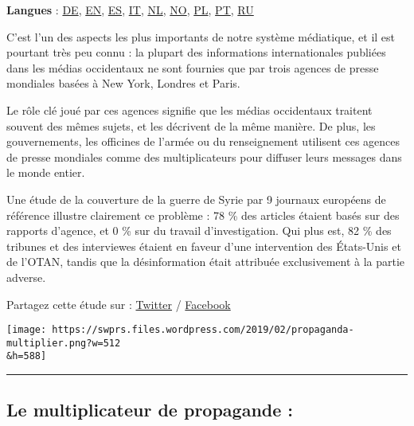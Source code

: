 \textbf{Langues} :
\href{https://swprs.org/der-propaganda-multiplikator/}{DE},
\href{https://swprs.org/the-propaganda-multiplier/}{EN},
\href{https://www.bibliotecapleyades.net/sociopolitica2/sociopol_mediacontrol225.htm}{ES},
\href{https://www.bibliotecapleyades.net/sociopolitica2/sociopol_mediacontrol228.htm}{IT},
\href{https://swprs.files.wordpress.com/2019/12/propaganda-multiplier-dutch.pdf}{NL},
\href{https://midtifleisen.wordpress.com/2018/01/04/en-titt-pa-nyhetsbyraenes-rolle/}{NO},
\href{https://wolnemedia.net/powielacze-propagandy/}{PL},
\href{https://revistaopera.com.br/2019/04/23/a-propagacao-hegemonica-como-as-agencias-globais-e-a-midia-ocidental-cobrem-a-geopolitica-parte-1/}{PT},
\href{https://csa.pnzgu.ru/infopswars/ipw1}{RU}

C'est l'un des aspects les plus importants de notre système médiatique,
et il est pourtant très peu connu : la plupart des informations
internationales publiées dans les médias occidentaux ne sont fournies
que par trois agences de presse mondiales basées à New York, Londres et
Paris.

Le rôle clé joué par ces agences signifie que les médias occidentaux
traitent souvent des mêmes sujets, et les décrivent de la même manière.
De plus, les gouvernements, les officines de l'armée ou du renseignement
utilisent ces agences de presse mondiales comme des multiplicateurs pour
diffuser leurs messages dans le monde entier.

Une étude de la couverture de la guerre de Syrie par 9 journaux
européens de référence illustre clairement ce problème : 78 \% des
articles étaient basés sur des rapports d'agence, et 0 \% sur du travail
d'investigation. Qui plus est, 82 \% des tribunes et des interviewes
étaient en faveur d'une intervention des États-Unis et de l'OTAN, tandis
que la désinformation était attribuée exclusivement à la partie adverse.

Partagez cette étude sur :
\href{https://twitter.com/intent/tweet?url=https://swprs.org/le-multiplicateur-de-propagande/}{Twitter}
/
\href{https://www.facebook.com/share.php?u=https://swprs.org/le-multiplicateur-de-propagande/}{Facebook}

\texttt{[image: https://swprs.files.wordpress.com/2019/02/propaganda-multiplier.png?w=512\\\&h=588]}

\begin{center}\rule{0.5\linewidth}{\linethickness}\end{center}

\hypertarget{le-multiplicateur-de-propagande-}{%
\subsection{Le multiplicateur de propagande
:}\label{le-multiplicateur-de-propagande-}}

